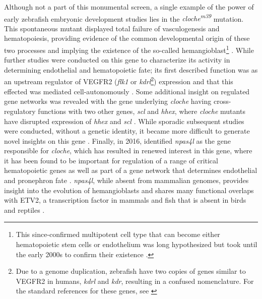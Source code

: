Although not a part of this monumental screen, a single example of the power of early zebrafish embryonic development studies lies in the \textit{cloche\textsuperscript{m39}} mutation. This spontaneous mutant displayed total failure of vasculogenesis and hematopoiesis, providing evidence of the common developmental origin of these two processes and implying the existence of the so\hyp{}called hemangioblast\footnote{This since\hyp{}confirmed multipotent cell type that can become either hematopoietic stem cells or endothelium was long hypothesized \citep{Murray1932, Sabin1920} but took until the early 2000s to confirm their existence \citep{Xiong2008}.} \citep{Stainier1995}. While further studies were conducted on this gene to characterize its activity in determining endothelial and hematopoietic fate; its first described function was as an upstream regulator of VEGFR2 (\textit{flk1} or \textit{kdrl}\footnote{Due to a genome duplication, zebrafish have two copies of genes similar to VEGFR2 in humans, \textit{kdrl} and \textit{kdr}, resulting in a confused nomenclature. For the standard references for these genes, see \citet{Bussmann2008}}) expression and that this effected was mediated cell\hyp{}autonomously \citep{Liao1997, Parker1999}. Some additional insight on regulated gene networks was revealed with the gene underlying \textit{cloche} having cross\hyp{}regulatory functions with two other genes, \textit{scl} and \textit{hhex}, where \textit{cloche} mutants have disrupted expression of \textit{hhex} and \textit{scl} \citep{Liao2000}. While sporadic subsequent studies were conducted, without a genetic identity, it became more difficult to generate novel insights on this gene \citep{Qian2005}. Finally, in 2016, \citeauthor{Reischauer2016} identified \textit{npas4l} as the gene responsible for \textit{cloche}, which has resulted in renewed interest in this gene, where it has been found to be important for regulation of a range of critical hematopoietic genes \citep{Marass2019} as well as part of a gene network that determines endothelial and pronephron fate \citep{Mattonet2022}. \textit{npas4l}, while absent from mammalian genomes, provides insight into the evolution of hemangioblasts and shares many functional overlaps with ETV2, a transcription factor in mammals and fish that is absent in birds and reptiles \citep{Weng2020, Vogeli2006}.


